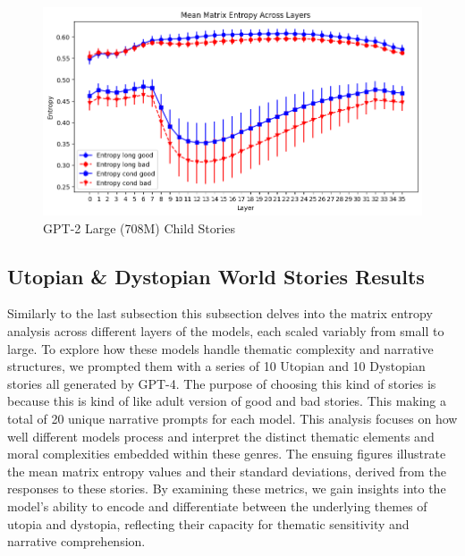 \documentclass{article}
\begin{document}
\begin{figure} [H]
\centering
    \begin{minipage}{0.5\linewidth}
        \includegraphics[width=\linewidth]{Large_Child_Stories.png}
        \caption{GPT-2 Large (708M) Child Stories}
        \label{fig:large_child_stories}
    \end{minipage}
\end{figure}





\subsection{Utopian \& Dystopian World Stories Results}

Similarly to the last subsection this subsection delves into the matrix entropy analysis across different layers of the models, each scaled variably from small to large. To explore how these models handle thematic complexity and narrative structures, we prompted them with a series of 10 Utopian and 10 Dystopian stories all generated by GPT-4. The purpose of choosing this kind of stories is because this is kind of like adult version of good and bad stories. This making a total of 20 unique narrative prompts for each model. This analysis focuses on how well different models process and interpret the distinct thematic elements and moral complexities embedded within these genres. The ensuing figures illustrate the mean matrix entropy values and their standard deviations, derived from the responses to these stories. By examining these metrics, we gain insights into the model's ability to encode and differentiate between the underlying themes of utopia and dystopia, reflecting their capacity for thematic sensitivity and narrative comprehension.
\end{document}
